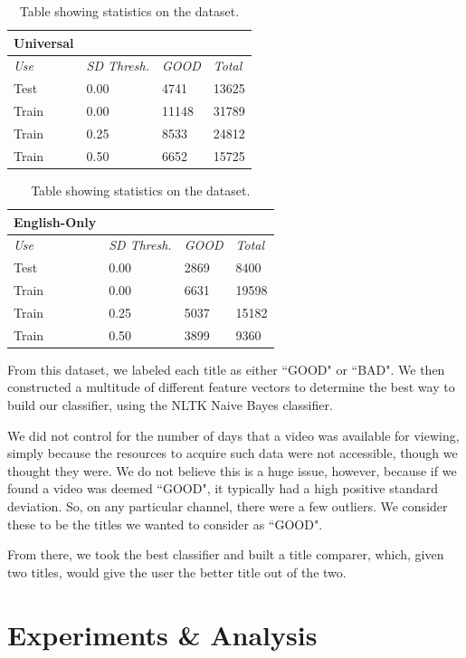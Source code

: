 \documentclass[a4paper,12pt]{article}
\begin{document}
\begin{table}[h]
  \small
  \centering
  \begin{tabular}{|l|l|l|l|}
    \hline
    \textbf{Universal}&&& \\ \hline \hline
    \textit{Use} & \textit{SD Thresh.} & \textit{GOOD} & \textit{Total} \\ \hline 
    Test & 0.00 & 4741 & 13625 \\ \hline
    Train & 0.00 & 11148 & 31789 \\ \hline
    Train & 0.25 & 8533 & 24812 \\ \hline
    Train & 0.50 & 6652 & 15725 \\ \hline
  \end{tabular}
  \quad
  \begin{tabular}{|l||l|l|l|}
    \hline
    \textbf{English-Only}&&& \\ \hline \hline
    \textit{Use} & \textit{SD Thresh.} & \textit{GOOD} & \textit{Total} \\ \hline 
    Test & 0.00 & 2869 & 8400 \\ \hline
    Train & 0.00 & 6631 & 19598 \\ \hline
    Train & 0.25 & 5037 & 15182 \\ \hline
    Train & 0.50 & 3899 & 9360 \\ \hline
  \end{tabular}

  \caption{Table showing statistics on the dataset.}
  \label{table:dataset-stats}
\end{table}

From this dataset, we labeled each title as either ``GOOD" or ``BAD". We then constructed a multitude of different feature vectors to determine the best way to build our classifier, using the NLTK Naive Bayes classifier. 

We did not control for the number of days that a video was available for viewing, simply because the resources to acquire such data were not accessible, though we thought they were. We do not believe this is a huge issue, however, because if we found a video was deemed ``GOOD", it typically had a high positive standard deviation. So, on any particular channel, there were a few outliers. We consider these to be the titles we wanted to consider as ``GOOD". 

From there, we took the best classifier and built a title comparer, which, given two titles, would give the user the better title out of the two. 


\section{Experiments \& Analysis}
\end{document}
